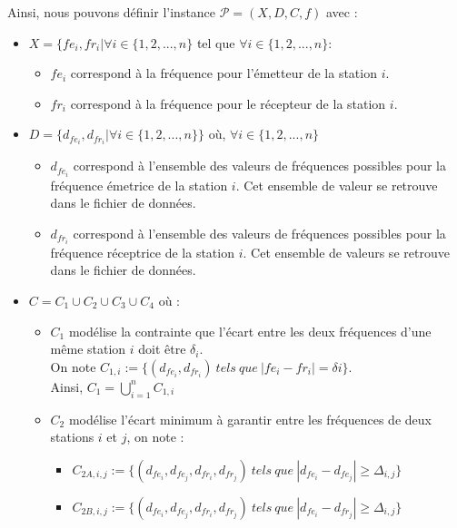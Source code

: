 \documentclass[a4paper, 10pt]{article}
\begin{document}
      Ainsi, nous pouvons définir l'instance $\mathcal{P} = (X, D, C, f)$ avec :
      \begin{itemize}
        \item $X = \{ fe_i, fr_i | \forall i \in \{1,2,...,n\}$ tel que $\forall i \in \{1,2,...,n\}$:
              \begin{itemize}
                \item $fe_{i}$ correspond à la fréquence pour l'émetteur de la station $i$.
                \item $fr_{i}$ correspond à la fréquence pour le récepteur de la station $i$.
              \end{itemize}
        \item $D = \{d_{fe_i}, d_{fr_i} | \forall i \in \{1,2,...,n\} \}$ où, $\forall i \in \{1,2,...,n\}$
              \begin{itemize}
                \item $d_{fe_i}$ correspond à l'ensemble des valeurs de fréquences possibles pour la fréquence émetrice de la station $i$. Cet ensemble de valeur se retrouve dans le fichier de données.
                \item $d_{fr_i}$ correspond à l'ensemble des valeurs de fréquences possibles pour la fréquence réceptrice de la station $i$. Cet ensemble de valeurs se retrouve dans le fichier de données.
              \end{itemize}
        \item $C = C_1 \cup C_2 \cup C_3 \cup C_4 $ où :
              \begin{itemize}
                \item $C_1$ modélise la contrainte que l'écart entre les deux fréquences d'une même station $i$ doit être $\delta_{i}$.\\
                 On note $C_{1,i} := \{ (d_{fe_i},d_{fr_i})~ tels~que~ | fe_{i} - fr_{i} | = \delta{i} \}$. \\
                 Ainsi, $\displaystyle{C_1 = \bigcup_{i=1}^{n} C_{1,i}}$
                \item $C_2$ modélise l'écart minimum à garantir entre les fréquences de deux stations $i$ et $j$, on note :
                      \begin{itemize}
                        \item $C_{2A,i,j} := \{(d_{fe_i},d_{fe_j},d_{fr_i},d_{fr_j}) ~tels~que~ | d_{fe_i} - d_{fe_j} | \geq \Delta_{i,j} \}$
                        \item $C_{2B,i,j} := \{(d_{fe_i},d_{fe_j},d_{fr_i},d_{fr_j}) ~tels~que~ | d_{fe_i} - d_{fr_j} | \geq \Delta_{i,j} \}$

\end{itemize}
\end{itemize}
\end{itemize}
\end{document}

